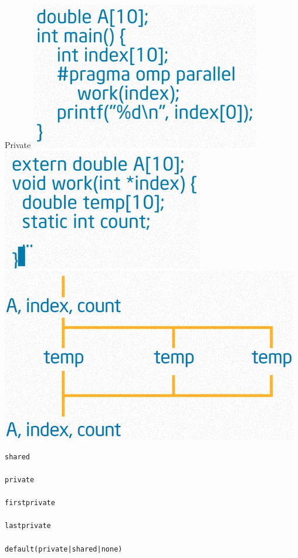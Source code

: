 \documentclass{beamer}
\begin{document}
\begin{frame}{Private}
  \includegraphics[height=0.3\textheight]{private}  
  \includegraphics[height=0.3\textheight]{private2}  
  \includegraphics[height=0.17\textheight]{private3}  
\end{frame}

\begin{frame}[fragile]
\begin{verbatim}
shared

private

firstprivate

lastprivate

default(private|shared|none)
\end{verbatim}
\end{frame}
\end{document}
